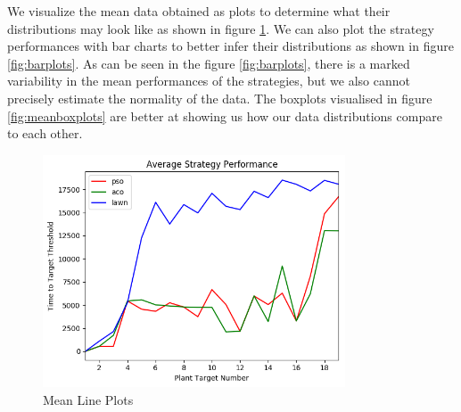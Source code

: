 \documentclass{report}
\begin{document}
We visualize the mean data obtained as plots to determine what their distributions may look like as shown in figure \ref{fig:meanlineplots}. We can also plot the strategy performances with bar charts to better infer their distributions as shown in figure \ref{fig:barplots}. As can be seen in the figure \ref{fig:barplots}, there is a marked variability in the mean performances of the strategies, but we also cannot precisely estimate the normality of the data. The boxplots visualised in figure \ref{fig:meanboxplots} are better at showing us how our data distributions compare to each other.

\begin{figure}[H]
	\centering
	\includegraphics[width=0.8\textwidth]{images/mean_line_plots}
	\caption{Mean Line Plots}
	\label{fig:meanlineplots}
\end{figure}
\end{document}
